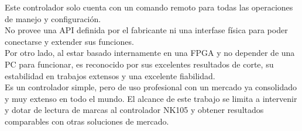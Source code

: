    Este controlador solo cuenta con un comando remoto para todas las operaciones de manejo y configuración. \\
   No provee una API definida por el fabricante ni una interfase física para poder conectarse y extender sus funciones. \\
   Por otro lado, al estar basado internamente en una FPGA y no depender de una PC para funcionar, es reconocido por sus excelentes resultados de corte, su estabilidad en trabajos extensos y una excelente fiabilidad. \\
   Es un controlador simple, pero de uso profesional con un mercado ya consolidado y muy extenso en todo el mundo.
   El alcance de este trabajo se limita a intervenir y dotar de lectura de marcas al controlador NK105 y obtener resultados comparables con otras soluciones de mercado.

